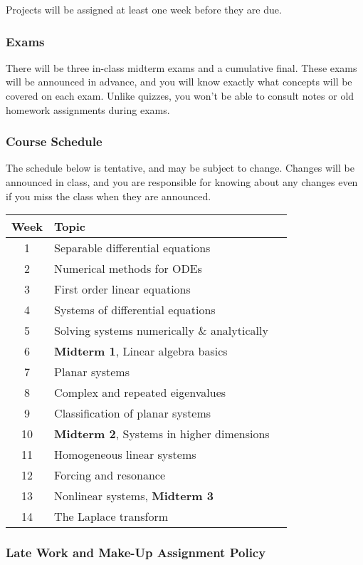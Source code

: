 \documentclass[10pt]{article}
\begin{document}
Projects will be assigned at least one week before they are due.

\subsubsection*{Exams}

There will be three in-class midterm exams and a cumulative final. These exams will be announced in advance, and you will know exactly what concepts will be covered on each exam.  Unlike quizzes, you won't be able to consult notes or old homework assignments during exams. 

\subsubsection*{Course Schedule} 

The schedule below is tentative, and may be subject to change. Changes will be announced in class, and you are responsible for knowing about any changes even if you miss the class when they are announced. 

\begin{center}
\begin{tabular}{|c|l|l|}
\hline
Week  & Topic \\ \hline
1 & Separable differential equations  \\
2 & Numerical methods for ODEs  \\
3 & First order linear equations  \\
4 & Systems of differential equations  \\
5 & Solving systems numerically \& analytically  \\
6 & \textbf{Midterm 1}, Linear algebra basics  \\
7 & Planar systems  \\
8 & Complex and repeated eigenvalues  \\
9 & Classification of planar systems  \\
10 & \textbf{Midterm 2}, Systems in higher dimensions  \\
11 & Homogeneous linear systems  \\
12 & Forcing and resonance  \\
13 & Nonlinear systems, \textbf{Midterm 3}  \\
14 & The Laplace transform  \\ \hline
\end{tabular}
\end{center}

\subsubsection*{Late Work and Make-Up Assignment Policy}
\end{document}
